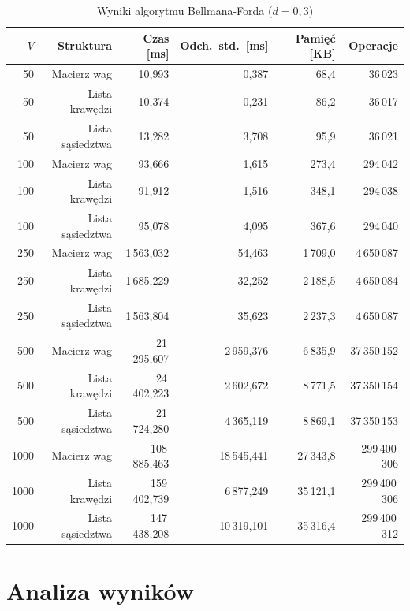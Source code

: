 \documentclass[12pt,a4paper]{article}
\begin{document}
\begin{table}[H]
\centering
\caption{Wyniki algorytmu Bellmana-Forda ($d = 0{,}3$)}
\label{tab:results_bf}
\small
\begin{tabular}{rrrrrr}
\toprule
$V$ & Struktura & Czas [ms] & Odch.\ std.\ [ms] & Pamięć [KB] & Operacje \\
\midrule
50  & Macierz wag      & 10{,}993  & 0{,}387 & 68{,}4   & 36\,023 \\
50  & Lista krawędzi   & 10{,}374  & 0{,}231 & 86{,}2   & 36\,017 \\
50  & Lista sąsiedztwa & 13{,}282  & 3{,}708 & 95{,}9   & 36\,021 \\
\midrule
100 & Macierz wag      & 93{,}666  & 1{,}615 & 273{,}4  & 294\,042 \\
100 & Lista krawędzi   & 91{,}912  & 1{,}516 & 348{,}1  & 294\,038 \\
100 & Lista sąsiedztwa & 95{,}078  & 4{,}095 & 367{,}6  & 294\,040 \\
\midrule
250 & Macierz wag      & 1\,563{,}032 & 54{,}463 & 1\,709{,}0 & 4\,650\,087 \\
250 & Lista krawędzi   & 1\,685{,}229 & 32{,}252 & 2\,188{,}5 & 4\,650\,084 \\
250 & Lista sąsiedztwa & 1\,563{,}804 & 35{,}623 & 2\,237{,}3 & 4\,650\,087 \\
\midrule
500 & Macierz wag      & 21\,295{,}607 & 2\,959{,}376 & 6\,835{,}9 & 37\,350\,152 \\
500 & Lista krawędzi   & 24\,402{,}223 & 2\,602{,}672 & 8\,771{,}5 & 37\,350\,154 \\
500 & Lista sąsiedztwa & 21\,724{,}280 & 4\,365{,}119 & 8\,869{,}1 & 37\,350\,153 \\
\midrule
1000 & Macierz wag     & 108\,885{,}463 & 18\,545{,}441 & 27\,343{,}8 & 299\,400\,306 \\
1000 & Lista krawędzi  & 159\,402{,}739 & 6\,877{,}249  & 35\,121{,}1 & 299\,400\,306 \\
1000 & Lista sąsiedztwa & 147\,438{,}208 & 10\,319{,}101 & 35\,316{,}4 & 299\,400\,312 \\
\bottomrule
\end{tabular}
\end{table}

\section{Analiza wyników}
\end{document}
